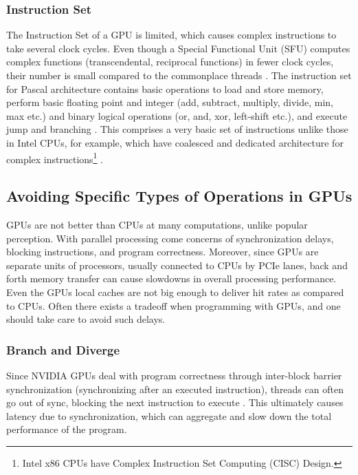 \subsubsection{Instruction Set}
The Instruction Set of a GPU is limited, which causes complex instructions to take several clock cycles. Even though a Special Functional Unit (SFU) computes complex functions (transcendental, reciprocal functions) in fewer clock cycles, their number is small compared to the commonplace threads \cite[Appendix~B]{PattersonARM}. The instruction set for Pascal architecture contains basic operations to load and store memory, perform basic floating point and integer (add, subtract, multiply, divide, min, max etc.) and binary logical operations (or, and, xor, left-shift etc.), and execute jump and branching \cite{wong2010demystifying,CUDABinUtils}. This comprises a very basic set of instructions unlike those in Intel CPUs, for example, which have coalesced and dedicated architecture for complex instructions\footnote{Intel x86 CPUs have Complex Instruction Set Computing (CISC) Design.} \cite{PattersonARM}.

\subsection{Avoiding Specific Types of Operations in GPUs} \label{sec:Avoiding Specific Operations in GPUs}
GPUs are not better than CPUs at many computations, unlike popular perception. With parallel processing come concerns of synchronization delays, blocking instructions, and program correctness. Moreover, since GPUs are separate units of processors, usually connected to CPUs by PCIe lanes, back and forth memory transfer can cause slowdowns in overall processing performance. Even the GPUs local caches are not big enough to deliver hit rates as compared to CPUs. Often there exists a tradeoff when programming with GPUs, and one should take care to avoid such delays.

\subsubsection{Branch and Diverge}
Since NVIDIA GPUs deal with program correctness through inter-block barrier synchronization (synchronizing after an executed instruction), threads can often go out of sync, blocking the next instruction to execute \cite[Appendix~B]{PattersonARM}. This ultimately causes latency due to synchronization, which can aggregate and slow down the total performance of the program.

